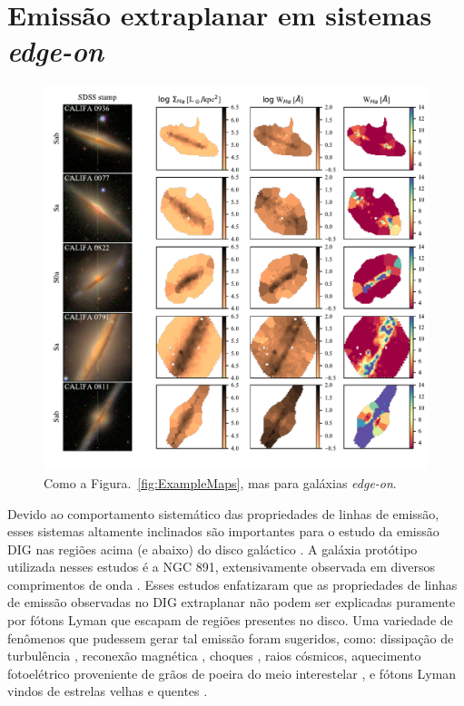 \section{Emissão extraplanar em sistemas {\em edge-on}}
\label{sec:DIGdisc:edgeon}

\begin{figure}
 \includegraphics{figuras/fig_maps_class_edgeon_paper.pdf}
 \caption[Imagem \SDSS e mapas de $\Sigma_{{\rm H}\alpha}$ e $W_{{\rm H}\alpha}$: sistemas {\em edge-on}]
 {Como a Figura.\ \ref{fig:ExampleMaps}, mas para galáxias {\em edge-on}.}
 \label{fig:ExampleMapsEdgeOn}
\end{figure}

Devido ao comportamento sistemático das propriedades de linhas de emissão, esses sistemas altamente inclinados são importantes para o estudo da emissão DIG nas regiões acima (e abaixo) do disco galáctico \citep{Tullmann.and.Dettmar.2000, Otte.etal.2002, Jones.etal.2017}. A galáxia protótipo utilizada nesses estudos é a NGC 891, extensivamente observada em diversos comprimentos de onda \citep{Rand.1998, Hodges.and.Bregman.2013, Seon.etal.2014, Hughes.etal.2015}. Esses estudos enfatizaram que as propriedades de linhas de emissão observadas no DIG extraplanar não podem ser explicadas puramente por fótons Lyman que escapam de regiões \hii presentes no disco. Uma variedade de fenômenos que pudessem gerar tal emissão foram sugeridos, como: dissipação de turbulência \citep{Minter.and.Spangler.1997}, reconexão magnética \citep{Raymond.1992}, choques \citep{Collins.and.Rand.2001}, raios cósmicos, aquecimento fotoelétrico proveniente de grãos de poeira do meio interestelar  \citep{Weingartner.and.Draine.2001}, e fótons Lyman vindos de estrelas velhas e quentes \citep{FloresFajardo.etal.2011a}.

